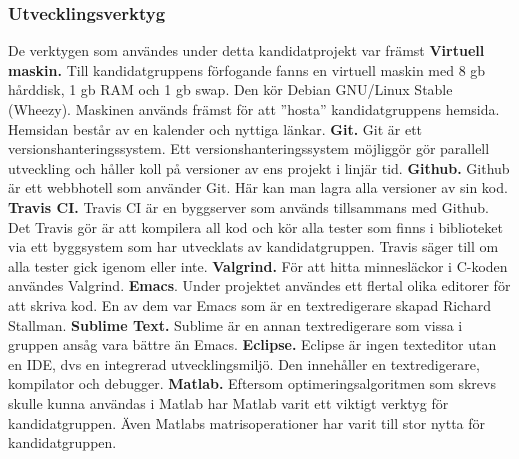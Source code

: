 \subsubsection{Utvecklingsverktyg}
De verktygen som användes under detta kandidatprojekt var främst
\newline
\newline
\textbf{Virtuell maskin.} Till kandidatgruppens förfogande fanns en virtuell maskin med 8 gb hårddisk, 1 gb RAM och 1 gb swap. Den kör Debian GNU/Linux Stable (Wheezy). Maskinen används främst för att ''hosta'' kandidatgruppens hemsida. Hemsidan består av en kalender och nyttiga länkar.
\newline
\newline 
\textbf{Git.} Git är ett versionshanteringssystem. Ett versionshanteringssystem möjliggör gör parallell utveckling och håller koll på versioner av ens projekt i linjär tid.
\newline
\newline 
\textbf{Github.} Github är ett webbhotell som använder Git. Här kan man lagra alla versioner av sin kod.
\newline
\newline 
\textbf{Travis CI.} Travis CI är en byggserver som används tillsammans med Github. Det Travis gör är att kompilera all kod och kör alla tester som finns i biblioteket via ett byggsystem som har utvecklats av kandidatgruppen. Travis säger till om alla tester gick igenom eller inte.
\newline
\newline
\textbf{Valgrind.} För att hitta minnesläckor i C-koden användes Valgrind.
\newline
\newline
\textbf{Emacs}. Under projektet användes ett flertal olika editorer för att skriva kod. En av dem var Emacs som är en textredigerare skapad Richard 	Stallman.
\newline
\newline
\textbf{Sublime Text.} Sublime är en annan textredigerare som vissa i gruppen ansåg vara bättre än Emacs.
\newline
\newline
\textbf{Eclipse.} Eclipse är ingen texteditor utan en IDE, dvs en integrerad utvecklingsmiljö. Den innehåller en textredigerare, kompilator och debugger.
\newline
\newline
\textbf{Matlab.} Eftersom optimeringsalgoritmen som skrevs skulle kunna användas i Matlab har Matlab varit ett viktigt verktyg för kandidatgruppen. Även Matlabs matrisoperationer har varit till stor nytta för kandidatgruppen.
